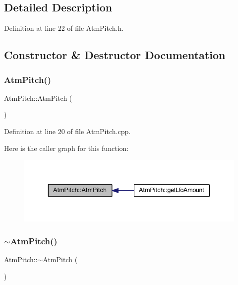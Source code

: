 \subsection{Detailed Description}


Definition at line 22 of file Atm\+Pitch.\+h.



\subsection{Constructor \& Destructor Documentation}
\mbox{\label{class_atm_pitch_a02c102d3f93af7a44230dad9c23f4023}} 
\subsubsection{\texorpdfstring{Atm\+Pitch()}{AtmPitch()}}
{\footnotesize\ttfamily Atm\+Pitch\+::\+Atm\+Pitch (\begin{DoxyParamCaption}{ }\end{DoxyParamCaption})}



Definition at line 20 of file Atm\+Pitch.\+cpp.

Here is the caller graph for this function\+:
\nopagebreak
\begin{figure}[H]
\begin{center}
\leavevmode
\includegraphics[width=343pt]{dd/d34/class_atm_pitch_a02c102d3f93af7a44230dad9c23f4023_icgraph}
\end{center}
\end{figure}
\mbox{\label{class_atm_pitch_aaefa1f3952ff8c8c6b8cf0ed99cc1fa7}} 
\subsubsection{\texorpdfstring{$\sim$\+Atm\+Pitch()}{~AtmPitch()}}
{\footnotesize\ttfamily Atm\+Pitch\+::$\sim$\+Atm\+Pitch (\begin{DoxyParamCaption}{ }\end{DoxyParamCaption})}



